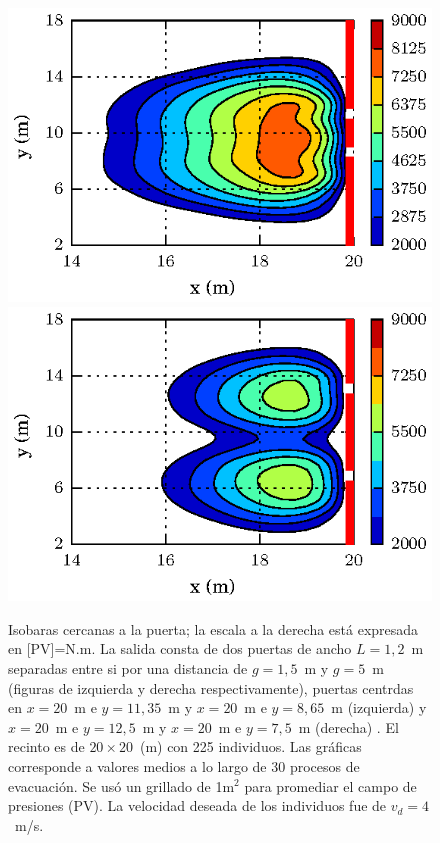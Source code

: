 \begin{figure}[H]
    \centering
    \includegraphics[scale=1]{figuras/isobaras_g1_5.eps}
        \includegraphics[scale=1]{figuras/isobaras_g5.eps}	
    \caption[width=5cm]{Isobaras cercanas a la puerta; la escala a la derecha está expresada en [PV]=N.m. La salida consta de dos puertas de ancho $L=1,2$~m separadas entre si por una distancia de $g=1,5$~m y $g=5$~m (figuras de izquierda y derecha respectivamente), puertas centrdas en $x=20$~m e $y=11,35$~m y $x=20$~m e $y=8,65$~m (izquierda) y $x=20$~m e $y=12,5$~m y $x=20$~m e $y=7,5$~m (derecha) . El recinto es de $20\times 20$~(m) con 225 individuos. Las gráficas corresponde a valores medios a lo largo de 30 procesos de evacuación. Se usó un grillado de 1m$^2$ para promediar el campo de presiones (PV). La velocidad deseada de los individuos fue de $v_d=4$~m/s.}
    \label{presion_225p_g1_5_y_5}
\end{figure}

